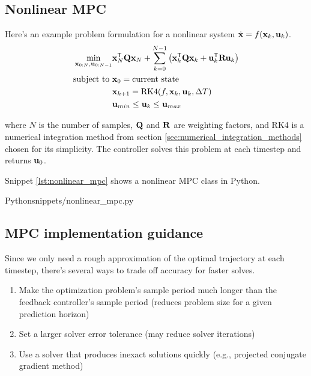 \subsection{Nonlinear MPC}

Here's an example problem formulation for a nonlinear system
$\dot{\mathbf{x}} = f(\mathbf{x}_k, \mathbf{u}_k)$.
\begin{align*}
  \min_{\mathbf{x}_{0:N}, \mathbf{u}_{0:N-1}}
    &\mathbf{x}_N^\mathsf{T}\mathbf{Q}\mathbf{x}_N +
     \sum_{k=0}^{N-1} \left(\mathbf{x}_k^\mathsf{T}\mathbf{Q}\mathbf{x}_k + \mathbf{u}_k^\mathsf{T}\mathbf{R}\mathbf{u}_k\right) \\
  \text{subject to } &\mathbf{x}_0 = \text{current state} \\
                     &\mathbf{x}_{k+1} = \text{RK4}(f, \mathbf{x}_k, \mathbf{u}_k, \Delta T) \\
                     &\mathbf{u}_{min} \leq \mathbf{u}_k \leq \mathbf{u}_{max}
\end{align*}

where $N$ is the number of samples, $\mathbf{Q}$ and $\mathbf{R}$ are weighting
factors, and RK4 is a numerical integration method from section
\ref{sec:numerical_integration_methods} chosen for its simplicity. The
controller solves this problem at each timestep and returns $\mathbf{u}_0$.

Snippet \ref{lst:nonlinear_mpc} shows a nonlinear MPC class in Python.
\begin{coderemote}{Python}{snippets/nonlinear_mpc.py}
  \caption{Nonlinear MPC class in Python}
  \label{lst:nonlinear_mpc}
\end{coderemote}

\subsection{MPC implementation guidance}

Since we only need a rough approximation of the optimal trajectory at each
timestep, there's several ways to trade off accuracy for faster solves.
\begin{enumerate}
  \item Make the optimization problem's sample period much longer than the
    feedback controller's sample period (reduces problem size for a given
    prediction horizon)
  \item Set a larger solver error tolerance (may reduce solver iterations)
  \item Use a solver that produces inexact solutions quickly (e.g., projected
    conjugate gradient method)
\end{enumerate}


